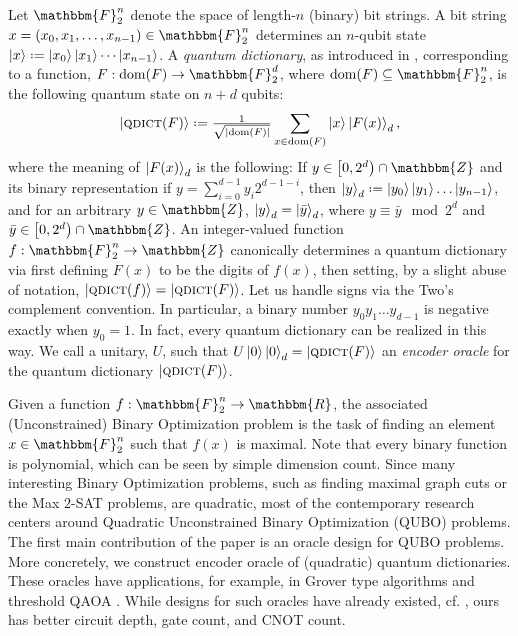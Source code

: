 \documentclass[reqno, 10pt]{amsart}
\numberwithin{equation}{section}                     %
\let\originalleft\left
\let\originalright\right
\renewcommand{\left}{\mathopen{}\mathclose\bgroup\originalleft}
\renewcommand{\right}{\aftergroup\egroup\originalright}
\def\({\mathopen{}\left(}
\def\){\right)\mathclose{}}
\newcommand*{\eqdef}{\mathrel{\vcenter{\baselineskip0.5ex \lineskiplimit0pt\hbox{.}\hbox{.}}}=}
\def\F{\mathbbm{F}}
\def\rl{\mathbbm{R}}
\def\Z{\mathbbm{Z}}
\def\dom{\mathrm{dom}}
\def\qdict{\textsc{qdict}}
\begin{document}
Let $\F_2^n$ denote the space of length-$n$ (binary) bit strings. A bit string $x = \( x_0, x_1, \ldots, x_{n - 1} \) \in \F_2^n$ determines an $n$-qubit state $\ket{x} \eqdef \ket{x_0} \ket{x_1} \cdots \ket{x_{n - 1}}$. A \emph{quantum dictionary}, as introduced in \cite{gilliam_foundational_2021}, corresponding to a function, $F: \dom \( F \) \rightarrow \F_2^d$, where $\dom \( F \) \subseteq \F_2^n$, is the following quantum state on $n + d$ qubits:
\begin{equation}
    \ket{\qdict \( F \)} \eqdef \tfrac{1}{\sqrt{\left| \dom \( F \) \right|}} \sum\limits_{x \in \dom \( F \)} \ket{x} \ket{F (x)}_d,
\end{equation}
where the meaning of $\ket{F (x)}_d$ is the following: If $y \in \left[ 0, 2^d \) \cap \Z$ and its binary representation if $y = \sum_{i = 0}^{d - 1} y_i 2^{d - 1 - i}$, then $\ket{y}_d \eqdef \ket{y_0} \ket{y_1} \ldots \ket{y_{n - 1}}$, and for an arbitrary $y \in \Z$, $\ket{y}_d = \ket{\bar{y}}_d$, where $y \equiv \bar{y} \!\! \mod 2^d$ and $\bar{y} \in \left[ 0, 2^d \) \cap \Z$. An integer-valued function $f : \F_2^n \rightarrow \Z$ canonically determines a quantum dictionary via first defining $F (x)$ to be the digits of $f (x)$, then setting, by a slight abuse of notation, $\ket{\qdict \( f \)} = \ket{\qdict \( F \)}$. Let us handle signs via the Two's complement convention. In particular, a binary number $y_0 y_1 \ldots y_{d - 1}$ is negative exactly when $y_0 = 1$. In fact, every quantum dictionary can be realized in this way. We call a unitary, $U$, such that $U \ket{0} \ket{0}_d = \ket{\qdict \( F \)}$ an \emph{encoder oracle} for the quantum dictionary $\ket{\qdict \( F \)}$.

\smallskip

Given a function $f : \F_2^n \rightarrow \rl$, the associated (Unconstrained) Binary Optimization problem is the task of finding an element $x \in \F_2^n$ such that $f (x)$ is maximal. Note that every binary function is polynomial, which can be seen by simple dimension count. Since many interesting Binary Optimization problems, such as finding maximal graph cuts or the Max $2$-SAT problems, are quadratic, most of the contemporary research centers around Quadratic Unconstrained Binary Optimization (QUBO) problems. The first main contribution of the paper is an oracle design for QUBO problems. More concretely, we construct encoder oracle of (quadratic) quantum dictionaries. These oracles have applications, for example, in Grover type algorithms and threshold QAOA \cite{golden_threshold_2021}. While designs for such oracles have already existed, cf. \cite{gilliam_grover_2021}, ours has better circuit depth, gate count, and CNOT count.
\end{document}
